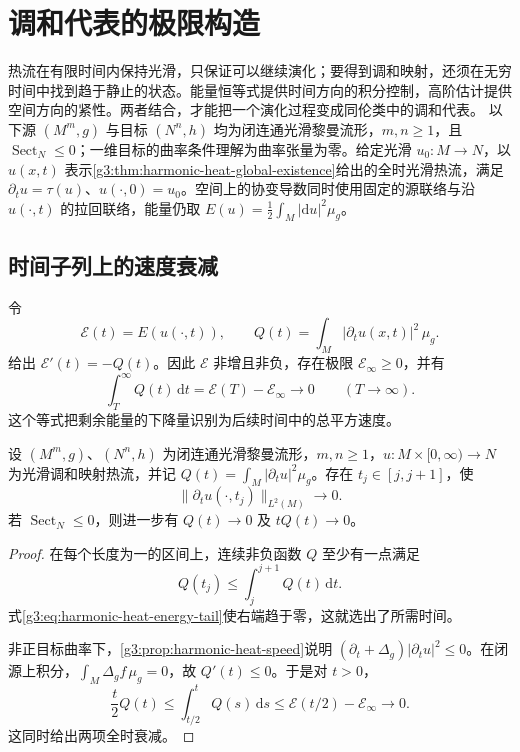 
% 
% 
% 

\section{调和代表的极限构造}
\label{g3:sec:2605}

热流在有限时间内保持光滑，只保证可以继续演化；要得到调和映射，还须在无穷时间中找到趋于静止的状态。能量恒等式提供时间方向的积分控制，高阶估计提供空间方向的紧性。两者结合，才能把一个演化过程变成同伦类中的调和代表。
\ProseParagraphBreak
以下源 \((M^m,g)\) 与目标 \((N^n,h)\) 均为闭连通光滑黎曼流形，\(m,n\ge1\)，且 \(\operatorname{Sect}_N\le0\)；一维目标的曲率条件理解为曲率张量为零。给定光滑 \(u_0:M\to N\)，以 \(u(x,t)\) 表示\cref{g3:thm:harmonic-heat-global-existence}给出的全时光滑热流，满足 \(\partial_tu=\tau(u)\)、\(u(\cdot,0)=u_0\)。空间上的协变导数同时使用固定的源联络与沿 \(u(\cdot,t)\) 的拉回联络，能量仍取 \(E(u)=\frac12\int_M|\mathrm du|^2\mu_g\)。

\subsection{时间子列上的速度衰减}
\label{g3:subsec:2605:01}
令
\[
	\mathcal E(t)=E(u(\cdot,t)),\qquad
	Q(t)=\int_M|\partial_tu(x,t)|^2\,\mu_g.
\]
给出 \(\mathcal E'(t)=-Q(t)\)。因此 \(\mathcal E\) 非增且非负，存在极限 \(\mathcal E_\infty\ge0\)，并有
\begin{equation}\label{g3:eq:harmonic-heat-energy-tail}
	\int_T^\infty Q(t)\,\mathrm dt
	=\mathcal E(T)-\mathcal E_\infty
	\longrightarrow0\qquad(T\to\infty).
\end{equation}
这个等式把剩余能量的下降量识别为后续时间中的总平方速度。

\begin{lemma}\label{g3:lem:harmonic-heat-slow-times}
	设 \((M^m,g)\)、\((N^n,h)\) 为闭连通光滑黎曼流形，\(m,n\ge1\)，\(u:M\times[0,\infty)\to N\) 为光滑调和映射热流，并记 \(Q(t)=\int_M|\partial_tu|^2\mu_g\)。存在 \(t_j\in[j,j+1]\)，使
	\[
		\|\partial_tu(\cdot,t_j)\|_{L^2(M)}\longrightarrow0.
	\]
	若 \(\operatorname{Sect}_N\le0\)，则进一步有 \(Q(t)\to0\) 及 \(tQ(t)\to0\)。
\end{lemma}
\begin{proof}
	在每个长度为一的区间上，连续非负函数 \(Q\) 至少有一点满足
	\[
		Q(t_j)\le\int_j^{j+1}Q(t)\,\mathrm dt.
	\]
	式\eqref{g3:eq:harmonic-heat-energy-tail}使右端趋于零，这就选出了所需时间。

	非正目标曲率下，\cref{g3:prop:harmonic-heat-speed}说明
	\((\partial_t+\Delta_g)|\partial_tu|^2\le0\)。在闭源上积分，\(\int_M\Delta_g f\,\mu_g=0\)，故 \(Q'(t)\le0\)。于是对 \(t>0\)，
	\[
		\frac t2Q(t)\le\int_{t/2}^tQ(s)\,\mathrm ds
		\le\mathcal E(t/2)-\mathcal E_\infty\longrightarrow0.
	\]
	这同时给出两项全时衰减。
\end{proof}

